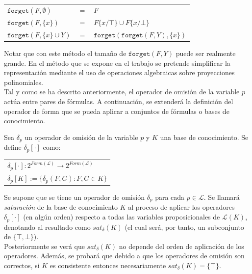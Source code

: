 \begin{tabular}{lll}
$\texttt{forget}(F, \emptyset)$ & $=$ & $F$\\
$\texttt{forget}(F, \{ x \})$ & $= $ & $F\{x/\top \} \cup F\{x/\bot \}$ \\
$\texttt{forget}(F, \{ x \} \cup Y)$ & $= $ & $\texttt{forget} (\texttt{forget}(F,Y),\{ x \})$
\end{tabular}

\vspace{0.5cm}

Notar que con este método el tamaño de $\texttt{forget}(F,Y)$ puede ser realmente grande. En el método que se expone en el trabajo se pretende simplificar la representación mediante el uso de operaciones algebraicas sobre proyecciones polinomiales.\\

Tal y como se ha descrito anteriormente, el operador de omisión de la variable $p$ actúa entre pares de fórmulas. A continuación, se extenderá la definición del operador de forma que se pueda aplicar a conjuntos de fórmulas o bases de conocimiento.

 Sea $\delta_p$ un operador de omisión de la variable $p$ y $K$ una base de conocimiento. Se define $\delta_p [\cdot ]$ como:\\
\begin{center}
\begin{tabular}{l}
$\delta_p [\cdot ] : 2^{Form(\mathcal{L})} \longrightarrow 2^{Form(\mathcal{L})}$ \\
$\delta_p [K] := \{ \delta_p (F,G) : F,G \in K \}$
\end{tabular}
\end{center}
\vspace{0.5cm}

 Se supone que se tiene un operador de omisión $\delta_p$ para cada $p\in \mathcal{L}$. Se llamará \textit{saturación} de la base de conocimiento $K$ al proceso de aplicar los operadores $\delta_p [\cdot ]$ (en algún orden) respecto a todas las variables proposicionales de $\mathcal{L}(K)$, denotando al resultado como $sat_{\delta}(K)$ (el cual será, por tanto, un subconjunto de $\{ \top , \bot \}$).\\

Posteriormente se verá que $sat_{\delta}(K)$ no depende del orden de aplicación de los operadores. Además, se probará que debido a que los operadores de omisión son correctos, si $K$ es consistente entonces necesariamente $sat_{\delta}(K)=\{ \top \}$.\\

